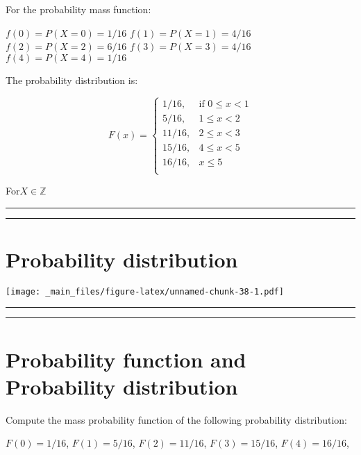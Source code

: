 \documentclass[
]{book}
\begin{document}
For the probability mass function:

\(f(0)=P(X=0)=1/16\)
\(f(1)=P(X=1)=4/16\)
\(f(2)=P(X=2)=6/16\)
\(f(3)=P(X=3)=4/16\)
\(f(4)=P(X=4)=1/16\)

The probability distribution is:

\[
    F(x)=
\begin{cases}
    1/16,& \text{if } 0 \leq x < 1\\
    5/16,& 1\leq x < 2\\
    11/16,& 2\leq x < 3\\
    15/16,& 4\leq x < 5\\
    16/16,&  x \leq 5\\
\end{cases}
\]

For\(X \in \mathbb{Z}\)

\begin{center}\rule{0.5\linewidth}{0.5pt}\end{center}

\begin{center}\rule{0.5\linewidth}{0.5pt}\end{center}

\hypertarget{probability-distribution-1}{%
\section{Probability distribution}\label{probability-distribution-1}}

\texttt{[image: \_main\_files/figure-latex/unnamed-chunk-38-1.pdf]}

\begin{center}\rule{0.5\linewidth}{0.5pt}\end{center}

\begin{center}\rule{0.5\linewidth}{0.5pt}\end{center}

\hypertarget{probability-function-and-probability-distribution}{%
\section{Probability function and Probability distribution}\label{probability-function-and-probability-distribution}}

Compute the mass probability function of the following probability distribution:

\(F(0)=1/16\), \(F(1)=5/16\), \(F(2)=11/16\), \(F(3)=15/16\), \(F(4)=16/16\),
\end{document}
